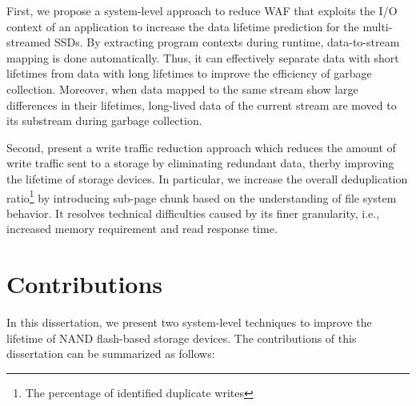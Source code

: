 First, we propose a system-level approach to reduce WAF that exploits
the I/O context of an application to increase the data lifetime prediction
for the multi-streamed SSDs. 
By extracting program contexts during runtime, data-to-stream mapping is done automatically.
Thus, it can effectively separate data with
short lifetimes from data with long lifetimes to improve the efficiency of garbage collection.
Moreover, when data mapped to the same
stream show large differences in their lifetimes,
long-lived data of the current stream are moved to 
its substream during garbage collection.

Second, present a write traffic reduction approach which reduces the amount of
write traffic sent to a storage by eliminating redundant data, therby improving
the lifetime of storage devices. In particular, we increase the overall
deduplication ratio\footnote{The percentage of identified duplicate writes}
by introducing sub-page chunk based on the understanding of file system behavior.
It resolves technical difficulties caused by its finer granularity, i.e., increased memory requirement and read
response time. 

\section{Contributions}
In this dissertation, we present two system-level techniques to improve the 
lifetime of NAND flash-based storage devices. 
The contributions of this dissertation can be summarized as follows:

